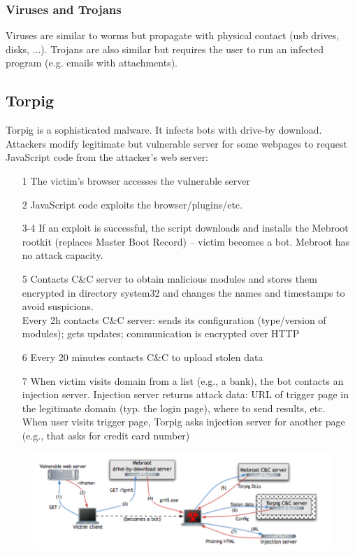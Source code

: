 \documentclass[10pt,a4paper]{report}
\begin{document}
\subsubsection{Viruses and Trojans}
Viruses are similar to worms but propagate with physical contact (usb drives, disks, ...). Trojans are also similar but requires the user to run an infected program (e.g. emails with attachments).
\subsection{Torpig}
Torpig is a sophisticated malware. It infects bots with drive-by download. Attackers modify legitimate but vulnerable server for some webpages to request JavaScript code from the attacker’s web server:
\begin{itemize}
\item[1] The victim’s browser accesses the vulnerable server
\item[2] JavaScript code exploits the browser/plugins/etc.
\item[3-4] If an exploit is successful, the script downloads and installs the Mebroot rootkit
(replaces Master Boot Record) – victim becomes a bot. Mebroot has no attack capacity.
\item[5] Contacts C\&C server to obtain malicious modules and stores them encrypted in directory system32 and changes the names and timestamps to avoid suspicions.\\
Every 2h contacts C\&C server: sends its configuration (type/version of modules); gets updates; communication is encrypted over HTTP
\item[6] Every 20 minutes contacts C\&C to upload stolen data
\item[7] When victim visits domain from a list (e.g., a bank), the bot contacts an injection server. Injection server returns attack data: URL of trigger page in the legitimate domain (typ. the login page), where to send results, etc.\\
When user visits trigger page, Torpig asks injection server for another page (e.g., that asks for credit card number)
\end{itemize}
\begin{figure}[H]
\centering
\includegraphics[scale=0.5]{2.png}
\end{figure}
\end{document}
